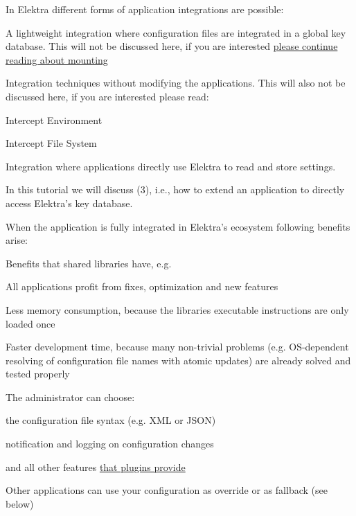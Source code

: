 In Elektra different forms of application integrations are possible\+:


\begin{DoxyEnumerate}
\item A lightweight integration where configuration files are integrated in a global key database. This will not be discussed here, if you are interested \hyperlink{doc_tutorials_mount_md}{please continue reading about mounting}
\item Integration techniques without modifying the applications. This will also not be discussed here, if you are interested please read\+:
\begin{DoxyItemize}
\item Intercept Environment
\item Intercept File System
\end{DoxyItemize}
\item Integration where applications directly use Elektra to read and store settings.
\end{DoxyEnumerate}

In this tutorial we will discuss (3), i.\+e., how to extend an application to directly access Elektra’s key database.

When the application is fully integrated in Elektra’s ecosystem following benefits arise\+:


\begin{DoxyItemize}
\item Benefits that shared libraries have, e.\+g.
\begin{DoxyItemize}
\item All applications profit from fixes, optimization and new features
\item Less memory consumption, because the libraries executable instructions are only loaded once
\item Faster development time, because many non-\/trivial problems (e.\+g. O\+S-\/dependent resolving of configuration file names with atomic updates) are already solved and tested properly
\end{DoxyItemize}
\item The administrator can choose\+:
\begin{DoxyItemize}
\item the configuration file syntax (e.\+g. X\+ML or J\+S\+ON)
\item notification and logging on configuration changes
\item and all other features \hyperlink{md_src_plugins_README_src_plugins_README_md}{that plugins provide}
\end{DoxyItemize}
\item Other applications can use your configuration as override or as fallback (see below)
\end{DoxyItemize}


